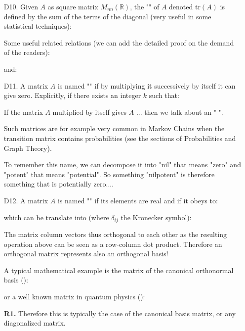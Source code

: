 \begin{enumerate}
		
		\item[D10.] Given $A$ as square matrix $M_{nn}(\mathbb{R})$, the "" of $A$ denoted $\text{tr}(A)$ is defined by the sum of the terms of the diagonal (very useful in some statistical techniques):
		
		Some useful related relations (we can add the detailed proof on the demand of the readers):
		
		and:
		

		\item[D11.] A matrix $A$ is named "" if by multiplying it successively by itself it can give zero. Explicitly, if there exists an integer $k$ such that:
		
		If the matrix $A$ multiplied by itself gives $A$ ... then we talk about an " ".
		
		Such matrices are for example very common in Markov Chains when the transition matrix contains probabilities (see the sections of Probabilities and Graph Theory).
		\begin{tcolorbox}[title=Remark,colframe=black,arc=10pt]
		To remember this name, we can decompose it into "nil" that means "zero" and "potent" that means "potential". So something "nilpotent" is therefore something that is potentially zero....
		\end{tcolorbox}
		
		\item[D12.] A matrix $A$ is named "\label{orthogonal matrix}" if its elements are real and if it obeys to:
		
		which can be translate into (where $\delta_{ij}$ the Kronecker symbol):
		
		The matrix column vectors thus orthogonal to each other as the resulting operation above can be seen as a row-column dot product. Therefore an orthogonal matrix represents also an orthogonal basis!
		
		A typical mathematical example is the matrix of the canonical orthonormal basis ():
		
		or a well known matrix in quantum physics ():
		
		\begin{tcolorbox}[title=Remarks,colframe=black,arc=10pt]
		\textbf{R1.} Therefore this is typically the case of the canonical basis matrix, or any diagonalized matrix.\\
		

\end{tcolorbox}
\end{enumerate}
